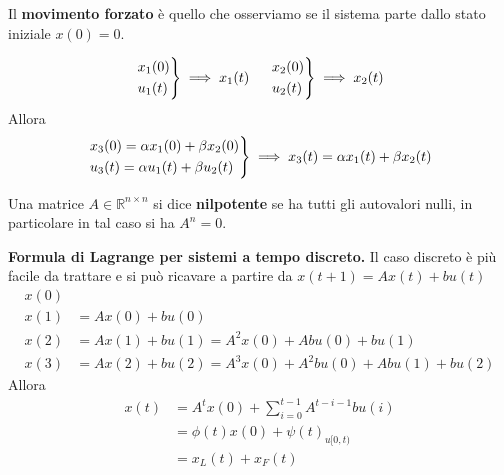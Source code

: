 Il \textbf{movimento forzato} è quello che osserviamo se il sistema parte dallo stato iniziale $x(0) =0$.
\begin{thm}
	\begin{equation*}
		\begin{drcases}
			x_1(0)\\
			u_1(t)
		\end{drcases} \implies x_1(t) \ \ \ \ \begin{drcases}
		x_2(0)\\
		u_2(t)
		\end{drcases} \implies x_2(t)
	\end{equation*}
	Allora
	\begin{equation*}
		\begin{drcases}
			x_3(0) =\alpha x_1(0) +\beta x_2(0)\\
			u_3(t) =\alpha u_1(t) +\beta u_2(t)
		\end{drcases} \implies x_3(t) =\alpha x_1(t) +\beta x_2(t)
	\end{equation*}
\end{thm}
\begin{rem}
	Una matrice $A\in \mathbb{R}^{n\times n}$ si dice \textbf{nilpotente} se ha tutti gli autovalori nulli, in particolare in tal caso si ha $A^n =0$.
\end{rem}
\textbf{Formula di Lagrange per sistemi a tempo discreto.} Il caso discreto è più facile da trattare e si può ricavare a partire da $x(t+1)=Ax(t)+bu(t)$
\begin{equation*}
	\begin{aligned}
		x(0) &                                                   \\
		x(1) & =Ax(0) +bu(0)                                     \\
		x(2) & =Ax(1) +bu(1) =A^2 x(0) +Abu(0) +bu(1)            \\
		x(3) & =Ax(2) +bu(2) =A^3 x(0) +A^2 bu(0) +Abu(1) +bu(2) 
	\end{aligned}
\end{equation*}
Allora
\begin{equation}
	\boxed{
		\begin{aligned}
			x(t) & =A^t x(0) +\sum\limits ^{t-1}_{i=0} A^{t-i-1} bu(i) \\
			     & =\phi (t) x(0) +\psi (t)_{u[ 0,t)}                  \\
			     & =x_L(t) +x_F(t)                                     
		\end{aligned}
	}
\end{equation}

